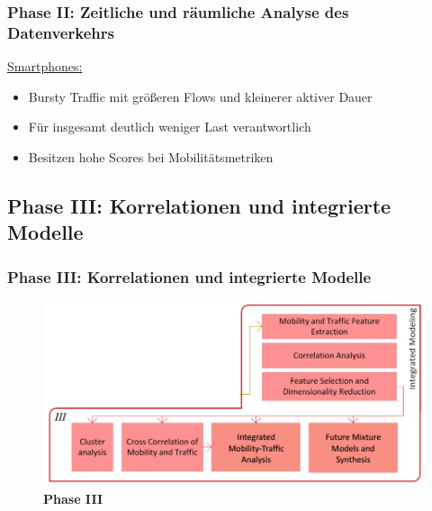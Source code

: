 \documentclass{beamer}
\begin{document}
\begin{frame}
  \frametitle{Phase II: Zeitliche und räumliche Analyse des Datenverkehrs}

  \begin{figure}[H]
    \centering
    \end{figure}

    \underline{Smartphones:}
    \begin{itemize}
      \item Bursty Traffic mit größeren Flows und kleinerer aktiver Dauer
      \item Für insgesamt deutlich weniger Last verantwortlich
      \item Besitzen hohe Scores bei Mobilitätsmetriken
    \end{itemize}
\end{frame}

\subsection{\textbf{Phase III}: Korrelationen und integrierte Modelle}

\begin{frame}
  \frametitle{Phase III: Korrelationen und integrierte Modelle}
  \begin{figure}
    \centering
    \includegraphics[width=\textwidth]{images/phase3.png}
    \caption*{\textbf{Phase III} \cite{Alipour2018}}
  \end{figure}  
\end{frame}
\end{document}
